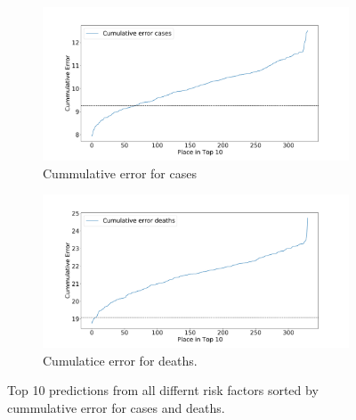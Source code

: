 \documentclass[letterpaper, inpress]{jds} %
\renewcommand{\_}{%
    \textunderscore\hspace{0pt}%
}
\begin{document}
\begin{figure}[!h]
    \begin{subfigure}{.90\textwidth}
        \centering
        \includegraphics[width=1.0\textwidth]{images/predict/PlaceTop10_CasesNEW2.pdf}
        \caption{Cummulative error for cases}
        \label{fig:place-top10-cases}
    \end{subfigure}
    \begin{subfigure}{.90\textwidth}
        \centering
        \includegraphics[width=1.0\textwidth]{images/predict/PlaceTop10_DeathNEW2.pdf}
        \caption{Cumulatice error for deaths.}
        \label{fig:place-top10-death}
    \end{subfigure}

    \caption{Top 10 predictions from all differnt risk factors sorted by cummulative error for cases and deaths.}
    \label{fig:place-top10}
    
    
\end{figure}
\end{document}
